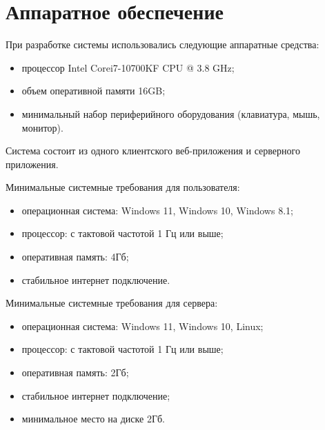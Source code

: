 \documentclass[../nirs.tex]{subfiles}
\begin{document}
    \section{Аппаратное обеспечение}
    При разработке системы использовались следующие аппаратные средства:

    \begin{itemize}
        \item процессор Intel Core\texttrademark\space i7-10700KF CPU @ 3.8 GHz;
        \item объем оперативной памяти 16GB;
        \item минимальный набор периферийного оборудования (клавиатура, мышь,
            монитор).
    \end{itemize}

    Система состоит из одного клиентского веб-приложения и серверного приложения.

    Минимальные системные требования для пользователя:
    \begin{itemize}
        \item операционная система: Windows 11, Windows 10, Windows 8.1;
        \item процессор: с тактовой частотой 1 Гц или выше;
        \item оперативная память: 4Гб;
        \item стабильное интернет подключение.
    \end{itemize}

    Минимальные системные требования для сервера:
    \begin{itemize}
        \item операционная система: Windows 11, Windows 10, Linux;
        \item процессор: с тактовой частотой 1 Гц или выше;
        \item оперативная память: 2Гб;
        \item стабильное интернет подключение;
        \item минимальное место на диске 2Гб.
    \end{itemize}
\end{document}
